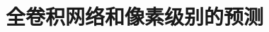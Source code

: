 \documentclass[UTF8]{ctexart}
\numberwithin{equation}{section} %
\numberwithin{table}{section} %
\begin{document}
\section{全卷积网络和像素级别的预测}
%
%
%
%
\end{document}
